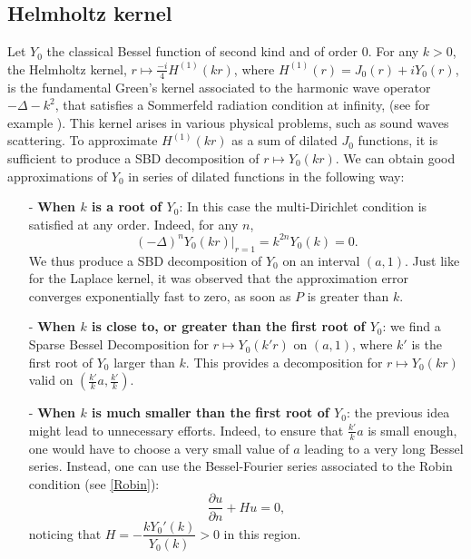\documentclass[smallextended]{svjour3}
\begin{document}
																														
\subsection{Helmholtz kernel}
\label{HelmoholtzSubSection}
Let $Y_0$ the classical Bessel function of second kind and of order $0$. For any $k>0$, the Helmholtz kernel, $r \mapsto \frac{-i}{4}H^{(1)}(kr)$, where $H^{(1)}(r) = J_0(r) + i Y_0(r)$, is the fundamental Green's kernel associated to the harmonic wave operator $- \Delta - k^2$, that satisfies a Sommerfeld radiation condition at infinity, (see for example  \cite{wilcox1975scattering}). This kernel arises in various physical problems, such as sound waves scattering. To approximate $H^{(1)}(kr)$ as a sum of dilated $J_0$ functions, it is sufficient to produce a SBD decomposition of $r \mapsto Y_0(kr)$. We can obtain good approximations of $Y_0$ in series of dilated functions in the following way:
\begin{itemize}
	\item[-]\textbf{When $k$ is a root of $Y_0$}: In this case the multi-Dirichlet condition is satisfied at any order. Indeed, for any $n$, 
	\[(-\Delta)^n Y_0(kr)\big|_{r=1} = k^{2n} Y_0(k) = 0.\]
	We thus produce a SBD decomposition of $Y_0$ on an interval $(a,1)$. Just like for the Laplace kernel, it was observed that the approximation error converges exponentially fast to zero, as soon as $P$ is greater than $k$. 
	\item[-]\textbf{When $k$ is close to, or greater than the first root of $Y_0$}: we find a Sparse Bessel Decomposition for $r \mapsto Y_0(k'r)$ on $(a,1)$, where $k'$ is the first root of $Y_0$ larger than $k$. This provides a decomposition for $r \mapsto Y_0(kr)$ valid on $(\frac{k'}{k}a,\frac{k'}{k})$.
	\item[-]\textbf{When $k$ is much smaller than the first root of $Y_0$}: the previous idea might lead to unnecessary efforts. Indeed, to ensure that $\frac{k'}{k}a$ is small enough, one would have to choose a very small value of $a$ leading to a very long Bessel series. Instead, one can use the Bessel-Fourier series associated to the Robin condition (see \autoref{Robin}):
	\[\dfrac{\partial u}{\partial n} + H u = 0,\]
	noticing that $H = -\dfrac{k Y_0'(k)}{Y_0(k)} > 0$ in this region. 
\end{itemize}
\noindent
\end{document}
